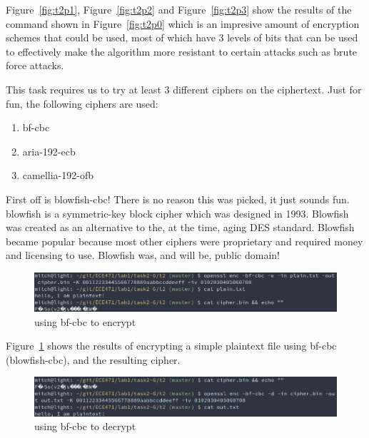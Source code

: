 \documentclass[12pt]{article}
\begin{document}
Figure~\ref{fig:t2p1}, Figure~\ref{fig:t2p2} and Figure~\ref{fig:t2p3} show the results of the command shown in 
Figure~\ref{fig:t2p0} which is an impresive amount of encryption schemes that could be used, most of which have 3 levels
of bits that can be used to effectively make the algorithm more resistant to certain attacks such as brute force attacks.

This task requires us to try at least 3 different ciphers on the ciphertext. Just for fun, the following ciphers are
used:

\begin{enumerate}
    \item bf-cbc
    \item aria-192-ecb
    \item camellia-192-ofb
\end{enumerate}

First off is blowfish-cbc! There is no reason this was picked, it just sounds fun. blowfish is a
symmetric-key block cipher which was designed in 1993. Blowfish was created as an alternative to the,
at the time, aging DES standard. Blowfish became popular because most other ciphers were proprietary
and required money and licensing to use. Blowfish was, and will be, public domain!

\begin{figure}[H]
    \begin{center}
        \includegraphics[scale=0.48]{t2p5.png}
    \end{center}{}
    \caption{using bf-cbc to encrypt}
    \label{fig:t2p5}
\end{figure}

Figure~\ref{fig:t2p5} shows the results of encrypting a simple plaintext file using bf-cbc
(blowfish-cbc), and the resulting cipher.

\begin{figure}[H]
    \begin{center}
        \includegraphics[scale=0.48]{t2p6.png}
    \end{center}{}
    \caption{using bf-cbc to decrypt}
    \label{fig:t2p6}
\end{figure}
\end{document}
